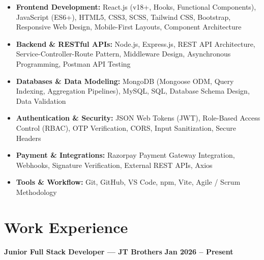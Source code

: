 \documentclass[a4paper,10pt]{article}
\begin{document}
\begin{itemize}

    \item \textbf{Frontend Development:}
    React.js (v18+, Hooks, Functional Components), JavaScript (ES6+),
    HTML5, CSS3, SCSS, Tailwind CSS, Bootstrap, Responsive Web Design,
    Mobile-First Layouts, Component Architecture

    \item \textbf{Backend \& RESTful APIs:}
    Node.js, Express.js, REST API Architecture, Service-Controller-Route Pattern,
    Middleware Design, Asynchronous Programming, Postman API Testing

    \item \textbf{Databases \& Data Modeling:}
    MongoDB (Mongoose ODM, Query Indexing, Aggregation Pipelines),
    MySQL, SQL, Database Schema Design, Data Validation

    \item \textbf{Authentication \& Security:}
    JSON Web Tokens (JWT), Role-Based Access Control (RBAC),
    OTP Verification, CORS, Input Sanitization, Secure Headers

    \item \textbf{Payment \& Integrations:}
    Razorpay Payment Gateway Integration, Webhooks, Signature Verification,
    External REST APIs, Axios

    \item \textbf{Tools \& Workflow:}
    Git, GitHub, VS Code, npm, Vite, Agile / Scrum Methodology

\end{itemize}

\section*{Work Experience}

\textbf{Junior Full Stack Developer --- JT Brothers}
\hfill
\textbf{Jan 2026 -- Present}
\end{document}
